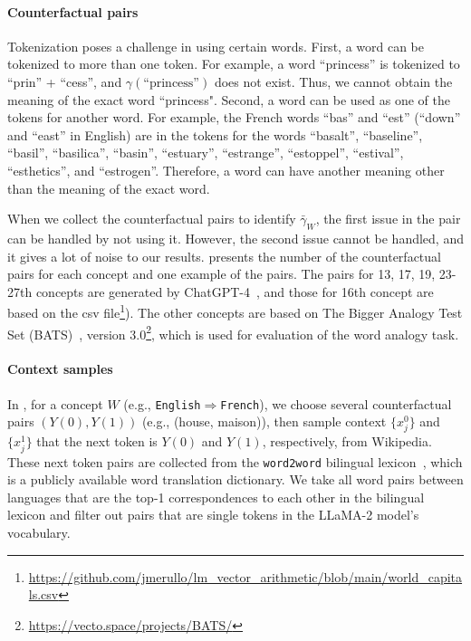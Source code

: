 \documentclass{article}
\theoremstyle{plain}
\theoremstyle{definition}
\theoremstyle{remark}
\newcommand{\ConceptDirName}[2]{\texttt{#1$\Rightarrow$#2}}
\begin{document}
\paragraph{Counterfactual pairs}
Tokenization poses a challenge in using certain words.
First, a word can be tokenized to more than one token. For example, a word ``princess'' is tokenized to ``prin'' + ``cess'', and $\gamma(\text{``princess''})$ does not exist. Thus, we cannot obtain the meaning of the exact word ``princess". Second, a word can be used as one of the tokens for another word. For example, the French words ``bas'' and ``est'' (``down'' and ``east'' in English) are in the tokens for the words ``basalt'', ``baseline'', ``basil'', ``basilica'', ``basin'', ``estuary'', ``estrange'', ``estoppel'', ``estival'', ``esthetics'', and ``estrogen''. Therefore, a word can have another meaning other than the meaning of the exact word.

When we collect the counterfactual pairs to identify $\bar\gamma_W$, the first issue in the pair can be handled by not using it. However, the second issue cannot be handled, and it gives a lot of noise to our results.  presents the number of the counterfactual pairs for each concept and one example of the pairs. The pairs for 13, 17, 19, 23-27th concepts are generated by ChatGPT-4~\citep{openai2023gpt4}, and those for 16th concept are based on the csv file\footnote{\url{https://github.com/jmerullo/lm_vector_arithmetic/blob/main/world_capitals.csv}}). The other concepts are based on The Bigger Analogy Test Set (BATS)~\citep{gladkova2016analogy}, version 3.0\footnote{\url{https://vecto.space/projects/BATS/}}, which is used for evaluation of the word analogy task.


\paragraph{Context samples}
In , for a concept $W$ (e.g., \ConceptDirName{English}{French}), we choose several counterfactual pairs $(Y(0), Y(1))$ (e.g., (house, maison)), then sample context $\{x_j^0\}$ and $\{x_j^1\}$ that the next token is $Y(0)$ and $Y(1)$, respectively, from Wikipedia. 
These next token pairs are collected from the \texttt{word2word} bilingual lexicon~\citep{choe2020word2word}, which is a publicly available word translation dictionary.
We take all word pairs between languages that are the top-1 correspondences to each other in the bilingual lexicon and filter out pairs that are single tokens in the LLaMA-2 model's vocabulary.
\end{document}
